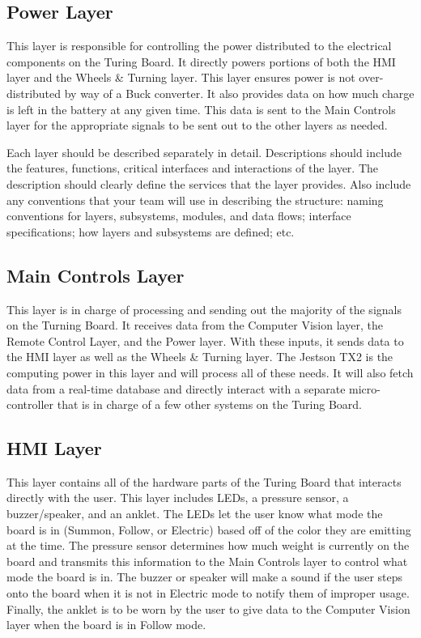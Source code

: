 \subsection{Power Layer}
This layer is responsible for controlling the power distributed to the electrical components on the Turing Board. It directly powers portions of both the HMI layer and the Wheels \& Turning layer. This layer ensures power is not over-distributed by way of a Buck converter. It also provides data on how much charge is left in the battery at any given time. This data is sent to the Main Controls layer for the appropriate signals to be sent out to the other layers as needed.

Each layer should be described separately in detail. Descriptions should include the features, functions, critical interfaces and interactions of the layer. The description should clearly define the services that the layer provides. Also include any conventions that your team will use in describing the structure: naming conventions for layers, subsystems, modules, and data flows; interface specifications; how layers and subsystems are defined; etc. 

\subsection{Main Controls Layer}
This layer is in charge of processing and sending out the majority of the signals on the Turning Board. It receives data from the Computer Vision layer, the Remote Control Layer, and the Power layer. With these inputs, it sends data to the HMI layer as well as the Wheels \& Turning layer. The Jestson TX2 is the computing power in this layer and will process all of these needs. It will also fetch data from a real-time database and directly interact with a separate micro-controller that is in charge of a few other systems on the Turing Board.

\subsection{HMI Layer}
This layer contains all of the hardware parts of the Turing Board that interacts directly with the user. This layer includes LEDs, a pressure sensor, a buzzer/speaker, and an anklet. The LEDs let the user know what mode the board is in (Summon, Follow, or Electric) based off of the color they are emitting at the time. The pressure sensor determines how much weight is currently on the board and transmits this information to the Main Controls layer to control what mode the board is in. The buzzer or speaker will make a sound if the user steps onto the board when it is not in Electric mode to notify them of improper usage. Finally, the anklet is to be worn by the user to give data to the Computer Vision layer when the board is in Follow mode.

